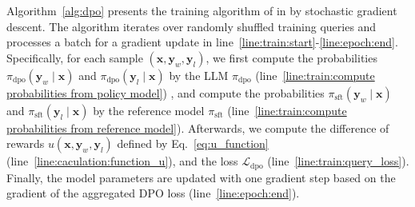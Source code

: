 Algorithm~\ref{alg:dpo} presents the training algorithm of \QDPO in \LLMQO{} by stochastic gradient descent. The algorithm iterates over randomly shuffled training queries and processes a batch for a gradient update in   line~\ref{line:train:start}-\ref{line:epoch:end}.  
%
Specifically, for each sample $(\bm{x},\bm{y}_w,\bm{y}_l)$, we first compute the probabilities $\pi_{\mathrm{dpo}}(\bm{y}_w \mid\bm{x})$ and $\pi_{\mathrm{dpo}}(\bm{y}_l \mid \bm{x})$ by the LLM  $\pi_{\mathrm{dpo}}$ (line~\ref{line:train:compute probabilities from policy model})
%
, and compute the probabilities $\pi_{\mathrm{sft}}(\bm{y}_w \mid \bm{x})$ and $\pi_{\mathrm{sft}}(\bm{y}_l\mid \bm{x})$ by the reference model $\pi_{\mathrm{sft}}$ (line~\ref{line:train:compute probabilities from reference model}). 
%
Afterwards, we compute the difference of rewards $u(\bm{x}, \bm{y}_w, \bm{y}_l)$ defined by Eq.~\eqref{eq:u_function}(line~\ref{line:caculation:function_u}), and the loss $\mathcal{L}_{\mathrm{dpo}}$ (line~\ref{line:train:query_loss}). 
%
Finally, the model parameters are updated with one gradient step based on the gradient of the aggregated DPO loss (line~\ref{line:epoch:end}). 






